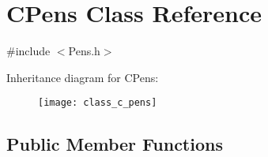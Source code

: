 \hypertarget{class_c_pens}{}\section{C\+Pens Class Reference}
\label{class_c_pens}


{\ttfamily \#include $<$Pens.\+h$>$}

Inheritance diagram for C\+Pens\+:\begin{figure}[H]
\begin{center}
\leavevmode
\texttt{[image: class\_c\_pens]}
\end{center}
\end{figure}
\subsection*{Public Member Functions}
